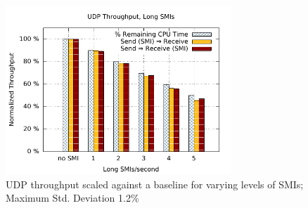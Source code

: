 \documentclass{IEEEtran}
\begin{document}
                               \begin{figure}[H]
                               \includegraphics[keepaspectratio=true,width=240pt]{jm_graph2.pdf}
                               \caption{UDP throughput scaled against a baseline for varying levels of SMIs;
                                   Maximum Std. Deviation 1.2\%}
                                   \label{jm_graph2}   
                                   \end{figure}
\end{document}
